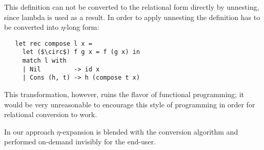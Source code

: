 This definition can not be converted to the relational form directly by unnesting, since lambda is used as a result. 
In order to apply unnesting the definition has to be converted into $\eta$-long form:

\begin{lstlisting}
   let rec compose l x =
     let ($\circ$) f g x = f (g x) in  
     match l with
     | Nil         -> id x
     | Cons (h, t) -> h (compose t x)
\end{lstlisting}

This transformation, however, ruins the flavor of functional programming; it would be very unreasonable to encourage this
style of programming in order for relational conversion to work.

In our approach $\eta$-expansion is blended with the conversion algorithm and performed on-demand invisibly for the end-user.








